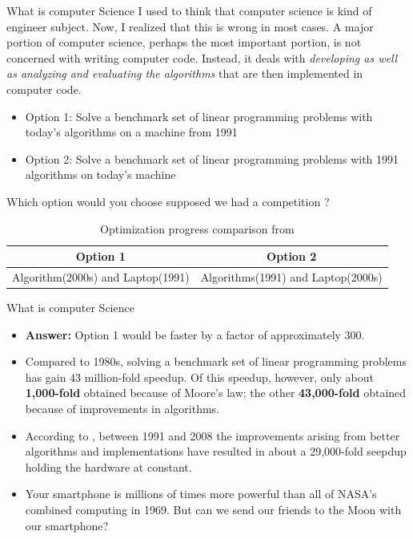 \documentclass[handout]{beamer} %
\begin{document}
\begin{frame}{What is computer Science}
	I used to think that computer science is kind of engineer subject. Now, I realized that this is wrong in most cases. A major portion of computer science, perhaps the most important portion, is not concerned with writing computer code. Instead, it deals with \textit{developing as well as analyzing and evaluating the algorithms} that are then implemented in computer code. 
\begin{itemize}
\setlength\itemsep{1em} 
	\item Option 1: Solve a benchmark set of linear programming problems with today’s algorithms on a machine from 1991
	\item Option 2: Solve a benchmark set of linear programming problems with 1991 algorithms on today’s machine 
\end{itemize}

Which option would you choose supposed we had a competition ?
\begin{table}[H]
	\centering
	\begin{tabular}{c|c}
	\hline
	\hline 
		Option 1 & Option 2 \\
		\hline 
		Algorithm(2000s) and Laptop(1991) & Algorithms(1991) and Laptop(2000s) \\
		\hline 
	\end{tabular}
	\caption{Optimization progress comparison from \cite{bixby2012brief}  }
\end{table}
\end{frame}


\begin{frame}{What is computer Science}
\begin{itemize}
\setlength\itemsep{1em} 
	\item \textbf{Answer:} Option 1 would be faster by a factor of approximately 300.
	\item Compared to 1980s, solving a benchmark set of linear programming problems has gain 43 million-fold speedup. Of this speedup, however, only about \textbf{1,000-fold} obtained because of Moore's law; the other \textbf{43,000-fold} obtained because of improvements in algorithms. 
	\item According to \cite{bixby2012brief}, between 1991 and 2008 the improvements arising from better algorithms and implementations have resulted in about a 29,000-fold seepdup holding the hardware at constant. 
	\item Your smartphone is millions of times more powerful than all of NASA’s combined computing in 1969. But can we send our friends to the Moon with our smartphone?
\end{itemize} 
	
\end{frame}
\end{document}
